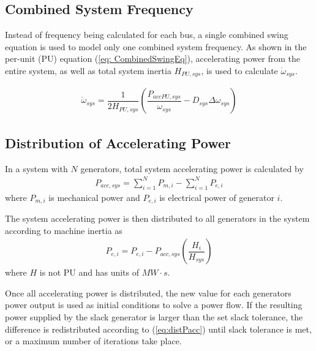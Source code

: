 \subsection{Combined System Frequency}
Instead of frequency being calculated for each bus, a single combined swing equation is used to model only one combined system frequency.
As shown in the per-unit (PU) equation (\ref{eq: CombinedSwingEq}), accelerating power from the entire system, as well as total system inertia $H_{PU, sys}$, is used to calculate $\dot{\omega}_{sys}$.

\begin{align}
\dot{\omega}_{sys} = \dfrac{1}{2H_{PU, sys} } \left( \dfrac{P_{acc PU, sys} }{\omega_{sys}} - D_{sys}\Delta\omega_{sys}  \right) \label{eq: CombinedSwingEq}
\end{align} 

\subsection{Distribution of Accelerating Power}
In a system with $N$ generators, total system accelerating power is calculated by
\begin{align}
P_{acc, sys} = \sum_{i=1}^{N} P_{m,i}  - \sum_{i=1}^{N} P_{e,i} \label{eq:Pacc} 
\end{align}
\noindent where $P_{m,i}$ is mechanical power and $P_{e,i}$ is electrical power of generator $i$.

The system accelerating power is then distributed to all generators in the system according to machine inertia as
\begin{align}
P_{e, i} = P_{e, i}  - P_{acc, sys}\left( \dfrac{H_i}{H_{sys}}\right) \label{eq:distPacc}
\end{align}
where $H$ is not PU and has units of $MW\cdot s$.

Once all accelerating power is distributed, the new value for each generators power output is used as initial conditions to solve a power flow. 
If the resulting power supplied by the slack generator is larger than the set slack tolerance, the difference is redistributed according to (\ref{eq:distPacc}) until slack tolerance is met, or a maximum number of iterations take place.

